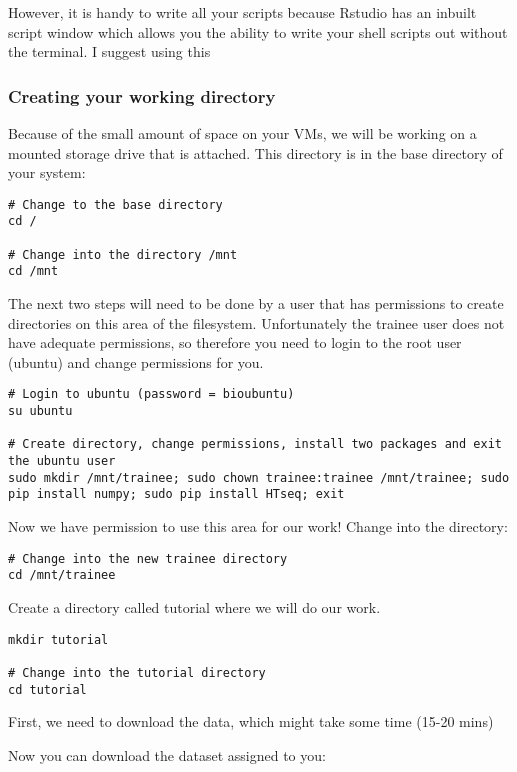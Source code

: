 However, it is handy to write all your scripts because Rstudio has an
inbuilt script window which allows you the ability to write your shell
scripts out without the terminal. I suggest using this

\subsubsection{Creating your working
directory}\label{creating-your-working-directory}

Because of the small amount of space on your VMs, we will be working on
a mounted storage drive that is attached. This directory is in the base
directory of your system:

\begin{verbatim}
# Change to the base directory
cd /

# Change into the directory /mnt
cd /mnt
\end{verbatim}

The next two steps will need to be done by a user that has permissions
to create directories on this area of the filesystem. Unfortunately the
trainee user does not have adequate permissions, so therefore you need
to login to the root user (ubuntu) and change permissions for you.

\begin{verbatim}
# Login to ubuntu (password = bioubuntu)
su ubuntu

# Create directory, change permissions, install two packages and exit the ubuntu user
sudo mkdir /mnt/trainee; sudo chown trainee:trainee /mnt/trainee; sudo pip install numpy; sudo pip install HTseq; exit
\end{verbatim}

Now we have permission to use this area for our work! Change into the
directory:

\begin{verbatim}
# Change into the new trainee directory
cd /mnt/trainee
\end{verbatim}

Create a directory called tutorial where we will do our work.

\begin{verbatim}
mkdir tutorial

# Change into the tutorial directory
cd tutorial
\end{verbatim}

First, we need to download the data, which might take some time (15-20
mins)

Now you can download the dataset assigned to you:

